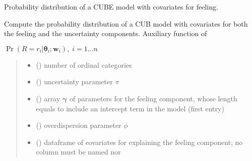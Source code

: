 \documentclass[letterpaper,10pt,english]{sphinxmanual}
\begin{document}

\begin{fulllineitems}
\label{\detokenize{cubmods:cubmods.cube_0w0.prob}}
\pysigstartsignatures
{}
\pysigstopsignatures
\sphinxAtStartPar
Probability distribution of a CUBE model with covariates for feeling.

\sphinxAtStartPar
Compute the probability distribution of a CUB model with covariates for both the feeling 
and the uncertainty components. Auxiliary function of 

\sphinxAtStartPar
\(\Pr(R = r_i | \pmb\theta_i ; \pmb w_i),\; i=1 \ldots n\)
\begin{quote}\begin{description}
\begin{itemize}
\item {} 
\sphinxAtStartPar
{} () \textendash{} number of ordinal categories

\item {} 
\sphinxAtStartPar
{} () \textendash{} uncertainty parameter \(\pi\)

\item {} 
\sphinxAtStartPar
{} () \textendash{} array \(\pmb \gamma\) of parameters for the feeling component, whose length equals 
 to include an intercept term in the model (first entry)

\item {} 
\sphinxAtStartPar
{} () \textendash{} overdispersion parameter \(\phi\)

\item {} 
\sphinxAtStartPar
{} () \textendash{} dataframe of covariates for explaining the feeling component;
no column must be named  nor 


\end{itemize}
\end{description}
\end{quote}
\end{fulllineitems}
\end{document}
